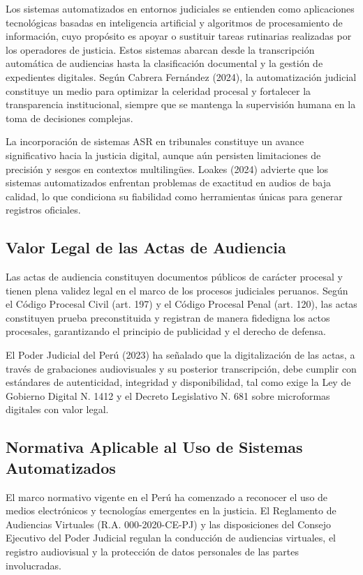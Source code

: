 \documentclass[12pt,a4paper,oneside]{report}
\begin{document}
Los sistemas automatizados en entornos judiciales se entienden como aplicaciones tecnológicas basadas en inteligencia artificial y algoritmos de procesamiento de información, cuyo propósito es apoyar o sustituir tareas rutinarias realizadas por los operadores de justicia. Estos sistemas abarcan desde la transcripción automática de audiencias hasta la clasificación documental y la gestión de expedientes digitales. Según Cabrera Fernández (2024), la automatización judicial constituye un medio para optimizar la celeridad procesal y fortalecer la transparencia institucional, siempre que se mantenga la supervisión humana en la toma de decisiones complejas.

La incorporación de sistemas ASR en tribunales constituye un avance significativo hacia la justicia digital, aunque aún persisten limitaciones de precisión y sesgos en contextos multilingües. Loakes (2024) advierte que los sistemas automatizados enfrentan problemas de exactitud en audios de baja calidad, lo que condiciona su fiabilidad como herramientas únicas para generar registros oficiales.

\subsection{Valor Legal de las Actas de Audiencia}

Las actas de audiencia constituyen documentos públicos de carácter procesal y tienen plena validez legal en el marco de los procesos judiciales peruanos. Según el Código Procesal Civil (art. 197) y el Código Procesal Penal (art. 120), las actas constituyen prueba preconstituida y registran de manera fidedigna los actos procesales, garantizando el principio de publicidad y el derecho de defensa.

El Poder Judicial del Perú (2023) ha señalado que la digitalización de las actas, a través de grabaciones audiovisuales y su posterior transcripción, debe cumplir con estándares de autenticidad, integridad y disponibilidad, tal como exige la Ley de Gobierno Digital N.\textordmasculine{} 1412 y el Decreto Legislativo N.\textordmasculine{} 681 sobre microformas digitales con valor legal.

\subsection{Normativa Aplicable al Uso de Sistemas Automatizados}

El marco normativo vigente en el Perú ha comenzado a reconocer el uso de medios electrónicos y tecnologías emergentes en la justicia. El Reglamento de Audiencias Virtuales (R.A. 000-2020-CE-PJ) y las disposiciones del Consejo Ejecutivo del Poder Judicial regulan la conducción de audiencias virtuales, el registro audiovisual y la protección de datos personales de las partes involucradas.
\end{document}
